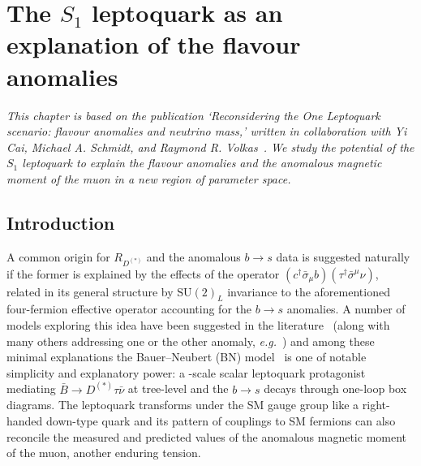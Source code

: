 \graphicspath{{img/chapter_4/}}


\chapter{The $S_{1}$ leptoquark as an explanation of the flavour anomalies}
\label{chapter:the-one-lq}

\begin{flushleft}
  \textit{This chapter is based on the publication `Reconsidering the One
    Leptoquark scenario: flavour anomalies and neutrino mass,' written in
    collaboration with Yi Cai, Michael A. Schmidt, and Raymond R.
    Volkas~\cite{Cai:2017wry}. We study the potential of the $S_{1}$ leptoquark
    to explain the flavour anomalies and the anomalous magnetic moment of the
    muon in a new region of parameter space.}
\end{flushleft}

\section{Introduction}

A common origin for $R_{D^{(*)}}$ and the anomalous $b\rightarrow s$ data is
suggested naturally if the former is explained by the effects of the operator
$(c^{\dagger} \bar{\sigma}_\mu b)(\tau^{\dagger} \bar{\sigma}^\mu \nu)$, related in its
general structure by $\mathrm{SU}(2)_L$ invariance to the aforementioned
four-fermion effective operator accounting for the $b \rightarrow s$ anomalies.
A number of models exploring this idea have been suggested in the
literature~\cite{Alonso:2015sja, Bauer:2015knc, Becirevic:2016oho,
  Becirevic:2016yqi, Boucenna:2016wpr, Boucenna:2016qad, Calibbi:2015kma,
  Crivellin:2017zlb, Deppisch:2016qqd, Deshpand:2016cpw, Fajfer:2015ycq,
  Feruglio:2016gvd, Feruglio:2017rjo, Megias:2017ove, Popov:2016fzr} (along
with many others addressing one or the other anomaly,
\textit{e.g.}~\cite{Becirevic:2015asa, Becirevic:2017jtw, Buras:2013qja,
  Freytsis:2015qca, Gauld:2013qba, Glashow:2014iga, Gripaios:2014tna,
  Hiller:2014ula, Hiller:2014yaa, Mahmoudi:2014mja, Megias:2016bde, Pas:2015hca,
  Sahoo:2015fla, Sahoo:2015qha, Sakaki:2013bfa, Sierra:2015fma,
  Varzielas:2015iva, deBoer:2015boa}) and among these minimal explanations the
Bauer--Neubert (BN) model~\cite{Bauer:2015knc} is one of notable simplicity and
explanatory power: a \TeV-scale scalar leptoquark protagonist mediating
$\bar{B}\rightarrow D^{(*)}\tau \bar{\nu}$ at tree-level and the
$b \rightarrow s$ decays through one-loop box diagrams. The leptoquark
transforms under the SM gauge group like a right-handed down-type quark and its
pattern of couplings to SM fermions can also reconcile the measured and
predicted values of the anomalous magnetic moment of the muon, another enduring
tension.

